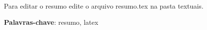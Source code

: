\begin{resumo}
	\vspace{\onelineskip}
	\noindent
	Para editar o resumo edite o arquivo resumo.tex na pasta textuais. 
	\par\textbf{Palavras-chave}: resumo, latex
\end{resumo}


